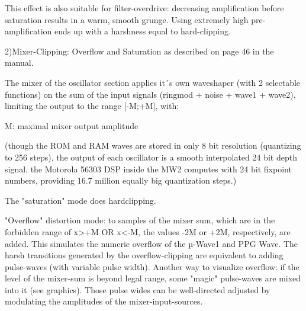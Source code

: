 This effect is also suitable for filter-overdrive: decreasing amplification before saturation results in a warm, smooth grunge. Using extremely high pre-amplification ends up with a harshness equal to hard-clipping.



2)Mixer-Clipping: Overflow and Saturation
as described on page 46 in the manual.

The mixer of the oscillator section applies it´s own waveshaper (with 2 selectable functions) on the sum of the input signals (ringmod + noise + wave1 + wave2), limiting the output to the range [-M;+M], with:

M: maximal mixer output amplitude

(though the ROM and RAM waves are stored in only 8 bit resolution (quantizing to 256 steps), the output of each oscillator is a smooth interpolated 24 bit depth signal. the Motorola 56303 DSP inside the MW2 computes with 24 bit fixpoint numbers, providing 16.7 million equally big quantization steps.)

The "saturation" mode does hardclipping.

"Overflow" distortion mode: to samples of the mixer sum, which are in the forbidden range of x>+M OR x<-M, the values -2M or +2M, respectively, are added. This simulates the numeric overflow of the µ-Wave1 and PPG Wave. The harsh transitions generated by the overflow-clipping are equivalent to adding pulse-waves (with variable pulse width).
Another way to visualize overflow:
if the level of the mixer-sum is beyond legal range, some "magic" pulse-waves are mixed into it (see graphics). Those pulse wides can be well-directed adjusted by modulating the amplitudes of the mixer-input-sources.

